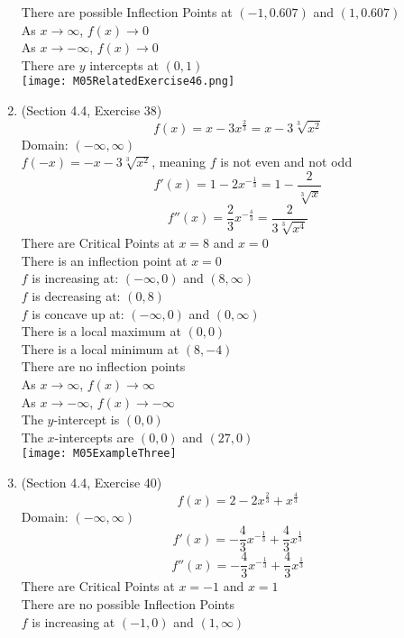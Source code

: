 \documentclass{article}
\begin{document}
\begin{enumerate}
        There are possible Inflection Points at $(-1, 0.607)$ and $(1, 0.607)$ \\
        As $x \to \infty$, $f(x) \to 0$ \\
        As $x \to -\infty$, $f(x) \to 0$ \\
        There are $y$ intercepts at $(0, 1)$ \\
        \texttt{[image: M05RelatedExercise46.png]}
    \item (Section 4.4, Exercise 38)
    $$f(x) = x-3x^{\frac{2}{3}} = x - 3\sqrt[3]{x^2}$$
    Domain: $(-\infty, \infty)$ \\
    $f(-x) = -x - 3\sqrt[3]{x^2}$, meaning $f$ is not even and not odd \\
    $$f'(x) = 1 - 2x^{-\frac{1}{3}} = 1 - \frac{2}{\sqrt[3]{x}}$$
    $$f''(x) = \frac{2}{3}x^{-\frac{4}{3}} = \frac{2}{3\sqrt[3]{x^4}}$$
    There are Critical Points at $x = 8$ and $x = 0$ \\
    There is an inflection point at $x = 0$ \\
    $f$ is increasing at: $(-\infty, 0)$ and $(8, \infty)$ \\
    $f$ is decreasing at: $(0, 8)$ \\
    $f$ is concave up at: $(-\infty, 0)$ and $(0, \infty)$ \\
    There is a local maximum at $(0, 0)$ \\
    There is a local minimum at $(8, -4)$ \\
    There are no inflection points \\
    As $x \to \infty$, $f(x) \to \infty$ \\
    As $x \to -\infty$, $f(x) \to -\infty$ \\
    The $y$-intercept is $(0, 0)$ \\
    The $x$-intercepts are $(0, 0)$ and $(27, 0)$ \\
    \texttt{[image: M05ExampleThree]}
    \item (Section 4.4, Exercise 40)
        $$f(x) = 2 - 2x^{\frac{2}{3}} + x^{\frac{4}{3}}$$
        Domain: $(-\infty, \infty)$ \\
        $$f'(x) = - \frac{4}{3}x^{-\frac{1}{3}} + \frac{4}{3}x^{\frac{1}{3}}$$
        $$f''(x) = - \frac{4}{3}x^{-\frac{1}{3}} + \frac{4}{3}x^{\frac{1}{3}}$$
        There are Critical Points at $x = -1$ and $x = 1$ \\
        There are no possible Inflection Points \\
        $f$ is increasing at $(-1, 0)$ and $(1, \infty)$ \\

\end{enumerate}
\end{document}
